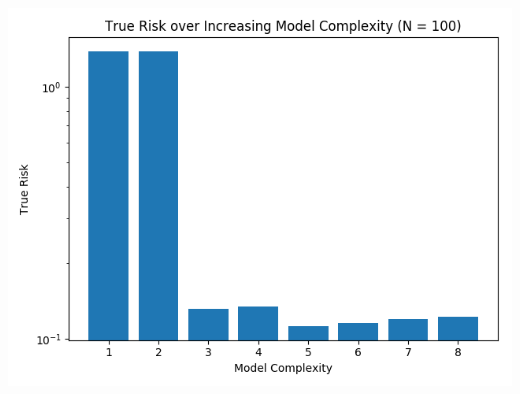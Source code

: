 \documentclass{article}
\begin{document}
\includegraphics[width=\linewidth]{true_100.png}
\end{document}
